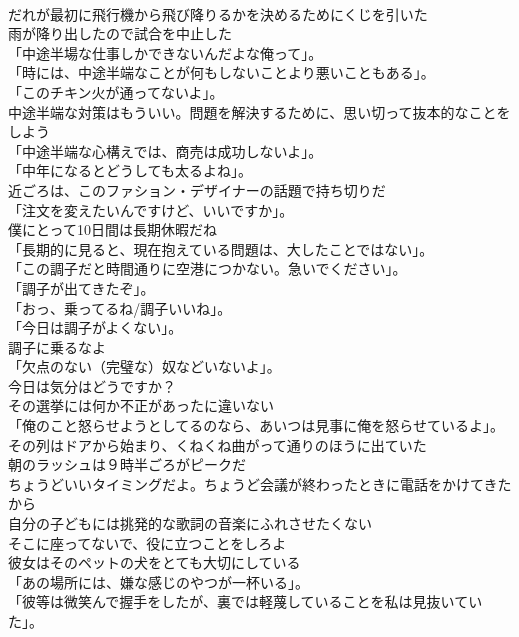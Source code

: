 \documentclass[8pt]{extreport}
\begin{document}
\begin{CJK}{UTF8}{min}
\\	だれが最初に飛行機から飛び降りるかを決めるためにくじを引いた	
\\	雨が降り出したので試合を中止した	
\\	「中途半場な仕事しかできないんだよな俺って」。	
\\	「時には、中途半端なことが何もしないことより悪いこともある」。	
\\	「このチキン火が通ってないよ」。	
\\	中途半端な対策はもういい。問題を解決するために、思い切って抜本的なことをしよう	
\\	「中途半端な心構えでは、商売は成功しないよ」。	
\\	「中年になるとどうしても太るよね」。	
\\	近ごろは、このファション・デザイナーの話題で持ち切りだ	
\\	「注文を変えたいんですけど、いいですか」。	
\\	僕にとって10日間は長期休暇だね	
\\	「長期的に見ると、現在抱えている問題は、大したことではない」。	
\\	「この調子だと時間通りに空港につかない。急いでください」。	
\\	「調子が出てきたぞ」。	
\\	「おっ、乗ってるね/調子いいね」。	
\\	「今日は調子がよくない」。	
\\	調子に乗るなよ	
\\	「欠点のない（完璧な）奴などいないよ」。	
\\	今日は気分はどうですか？	
\\	その選挙には何か不正があったに違いない	
\\	「俺のこと怒らせようとしてるのなら、あいつは見事に俺を怒らせているよ」。	
\\	その列はドアから始まり、くねくね曲がって通りのほうに出ていた	
\\	朝のラッシュは９時半ごろがピークだ	
\\	ちょうどいいタイミングだよ。ちょうど会議が終わったときに電話をかけてきたから	
\\	自分の子どもには挑発的な歌詞の音楽にふれさせたくない	
\\	そこに座ってないで、役に立つことをしろよ	
\\	彼女はそのペットの犬をとても大切にしている	
\\	「あの場所には、嫌な感じのやつが一杯いる」。	
\\	「彼等は微笑んで握手をしたが、裏では軽蔑していることを私は見抜いていた」。	

\end{CJK}
\end{document}

